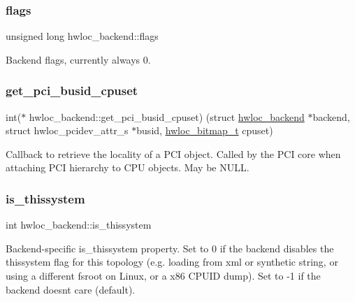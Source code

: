\subsubsection{\texorpdfstring{flags}{flags}}
{\footnotesize\ttfamily unsigned long hwloc\+\_\+backend\+::flags}



Backend flags, currently always 0. 

\mbox{\label{a00374_aaac253491264c20930f44817270bc502}} 
\subsubsection{\texorpdfstring{get\+\_\+pci\+\_\+busid\+\_\+cpuset}{get\_pci\_busid\_cpuset}}
{\footnotesize\ttfamily int($\ast$ hwloc\+\_\+backend\+::get\+\_\+pci\+\_\+busid\+\_\+cpuset) (struct \hyperlink{a00374}{hwloc\+\_\+backend} $\ast$backend, struct hwloc\+\_\+pcidev\+\_\+attr\+\_\+s $\ast$busid, \hyperlink{a00205_gaa3c2bf4c776d603dcebbb61b0c923d84}{hwloc\+\_\+bitmap\+\_\+t} cpuset)}



Callback to retrieve the locality of a P\+CI object. Called by the P\+CI core when attaching P\+CI hierarchy to C\+PU objects. May be N\+U\+LL. 

\mbox{\label{a00374_ab8806f6db077f1bb2e9d63ec99223f7a}} 
\subsubsection{\texorpdfstring{is\+\_\+thissystem}{is\_thissystem}}
{\footnotesize\ttfamily int hwloc\+\_\+backend\+::is\+\_\+thissystem}



Backend-\/specific \textquotesingle{}is\+\_\+thissystem\textquotesingle{} property. Set to 0 if the backend disables the thissystem flag for this topology (e.\+g. loading from xml or synthetic string, or using a different fsroot on Linux, or a x86 C\+P\+U\+ID dump). Set to -\/1 if the backend doesn\textquotesingle{}t care (default). 

